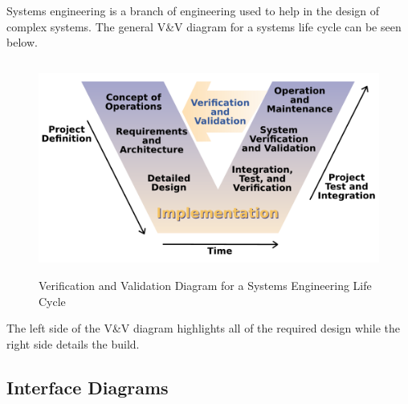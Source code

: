 \documentclass{article}
\begin{document}
Systems engineering is a branch of engineering used to help in the
design of complex systems. The general V\&V diagram for a systems life
cycle can be seen below.
\begin{figure}[H]
  \begin{center}
  \includegraphics[height=70mm]{Figures/VandV}
  \end{center}
  \caption{Verification and Validation Diagram for a Systems
    Engineering Life Cycle \cite{vandv}}
\end{figure}
The left side of the V\&V diagram highlights all of the required
design while the right side details the build. 

\subsection{Interface Diagrams} 
\end{document}
